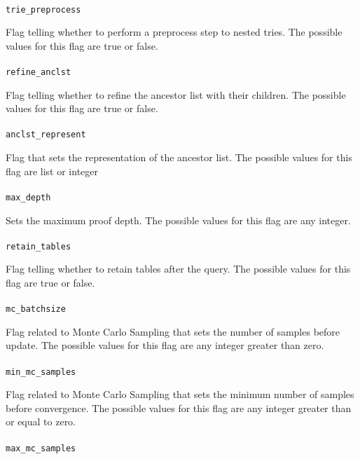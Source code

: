 \documentclass[a4paper,12pt]{article}
\begin{document}
\paragraph{}
\texttt{trie\_preprocess}

Flag telling whether to perform a preprocess step to nested tries.
The possible values for this flag are true or false.
\paragraph{}
\texttt{refine\_anclst}

Flag telling whether to refine the ancestor list with their children.
The possible values for this flag are true or false.
\paragraph{}
\texttt{anclst\_represent}

Flag that sets the representation of the ancestor list.
The possible values for this flag are list or integer
\paragraph{}
\texttt{max\_depth}

Sets the maximum proof depth.
The possible values for this flag are any integer.
\paragraph{}
\texttt{retain\_tables}

Flag telling whether to retain tables after the query.
The possible values for this flag are true or false.
\paragraph{}
\texttt{mc\_batchsize}

Flag related to Monte Carlo Sampling that sets the number of samples before update.
The possible values for this flag are any integer greater than zero.
\paragraph{}
\texttt{min\_mc\_samples}

Flag related to Monte Carlo Sampling that sets the minimum number of samples before convergence.
The possible values for this flag are any integer greater than or equal to zero.
\paragraph{}
\texttt{max\_mc\_samples}
\end{document}
